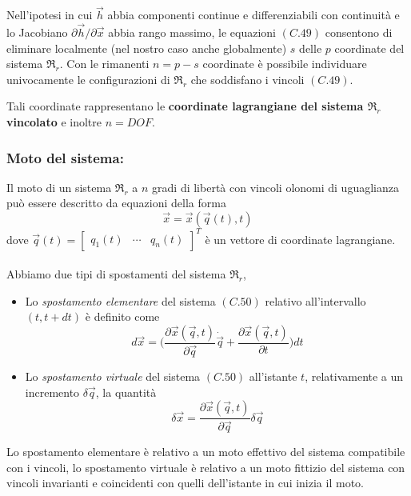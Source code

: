 Nell'ipotesi in cui $\vec{h}$ abbia componenti continue e differenziabili con continuità e lo Jacobiano $\partial \vec{h} / \partial \vec{x}$ abbia rango massimo, le equazioni $(C.49)$ consentono di eliminare localmente (nel nostro caso anche globalmente) $s$ delle $p$ coordinate del sistema $\mathfrak{R}_r$. Con le rimanenti $n = p - s$ coordinate è possibile individuare univocamente le configurazioni di $\mathfrak{R}_r$ che soddisfano i vincoli $(C.49)$. 

Tali coordinate rappresentano le \textbf{coordinate lagrangiane del sistema $\mathfrak{R}_r$ vincolato} e inoltre $n = DOF$.
\subsubsection{Moto del sistema:}
Il moto di un sistema $\mathfrak{R}_r$ a $n$ gradi di libertà con vincoli olonomi di uguaglianza può essere descritto da equazioni della forma
\begin{equation}
	\vec{x} = \vec{x}(\vec{q}(t), t)
\end{equation}
dove $\vec{q}(t) = 
\begin{bmatrix}
	q_1(t) & \cdots & q_n(t)
\end{bmatrix}^T
$ è un vettore di coordinate lagrangiane.
\paragraph{}
Abbiamo due tipi di spostamenti del sistema $\mathfrak{R}_r$, 
\begin{itemize}
	\item Lo \emph{spostamento elementare} del sistema $(C.50)$ relativo all'intervallo $(t, t+dt)$ è definito come
		\begin{equation}
			d\vec{x} = \Biggl( \frac{\partial \vec{x}(\vec{q}, t)}{\partial \vec{q}}\dot{\vec{q}} + \frac{\partial \vec{x}(\vec{q}, t)}{\partial t} \Biggr) dt
		\end{equation}
	\item Lo \emph{spostamento virtuale} del sistema $(C.50)$ all'istante $t$, relativamente a un incremento $\delta \vec{q}$, la quantità
		\begin{equation}
			\delta \vec{x} = \frac{\partial \vec{x}(\vec{q}, t)}{\partial \vec{q}} \delta \vec{q}
		\end{equation}
\end{itemize}

Lo spostamento elementare è relativo a un moto effettivo del sistema compatibile con i vincoli, lo spostamento virtuale è relativo a un moto fittizio del sistema con vincoli invarianti e coincidenti con quelli dell'istante in cui inizia il moto.

